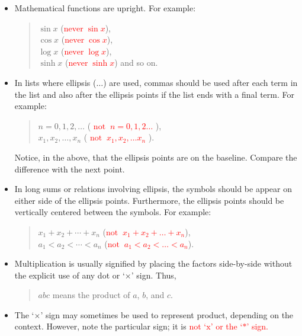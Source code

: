 \begin{itemize}
\item Mathematical functions are upright. For example:
\begin{quote}
$\sin x$ \quad (\textcolor{red}{$\text{never} \; \sin x$}), \\
$\cos x$ \quad (\textcolor{red}{$\text{never} \; \cos x$}), \\
$\log x$ \quad (\textcolor{red}{$\text{never} \; \log x$}), \\
$\sinh x$ \quad (\textcolor{red}{$\text{never} \; \sinh x$}) and so on.
\end{quote}

\item In lists where ellipsis ($\ldots$) are used, commas should be used after each term in the list and also after the ellipsis points if the list ends with a final term. For example:
\begin{quote}
$n = 0, 1, 2, \ldots$ \quad (\textcolor{red}{ $\text{not} \;\; n=0, 1, 2 \ldots$  }), \\
$x_1, x_2, \ldots, x_n$ \quad (\textcolor{red}{ $\text{not} \;\; x_1, x_2, \ldots x_n$  }).
\end{quote}
Notice, in the above, that the ellipsis points are on the baseline. Compare the difference with the next point.

\item In long sums or relations involving ellipsis, the symbols should be appear on either side of the ellipsis points. Furthermore, the ellipsis points should be vertically centered between the symbols. For example:
\begin{quote}
$x_1 + x_2 + \cdots + x_n$ \quad (\textcolor{red}{$\text{not} \;\;  x_1 + x_2 + \ldots + x_n$}), \\
$a_1 < a_2 < \cdots < a_n$ \quad (\textcolor{red}{$\text{not} \;\; a_1 < a_2 < \ldots < a_n$}).
\end{quote} 

\item Multiplication is usually signified by placing the factors side-by-side without the explicit use of any dot or `$\times$' sign. Thus,
\begin{quote}
$a b c$ means the product of $a$, $b$, and $c$. 
\end{quote}

\item The `$\times$' sign may sometimes be used to represent product, depending on the context. However, note the particular sign; it is \textcolor{red}{not `$\mathrm{x}$' or the `$*$' sign.} 




\end{itemize}

